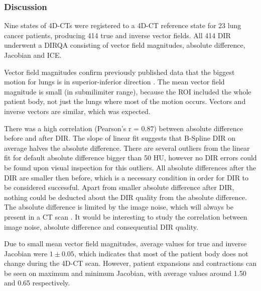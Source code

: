 \documentclass[type=dr, dr=rernat, accentcolor=tud7b,colorbacktitle, bigchapter, openright, twoside, 12pt ]{tudthesis}
\begin{document}
\newpage
\subsubsection{Discussion}
Nine states of 4D-CTs were registered to a 4D-CT reference state for 23 lung cancer patients, producing 414 true and inverse vector fields. All 414 DIR underwent a DIRQA consisting of vector field magnitudes, absolute difference, Jacobian and ICE.

Vector field magnitudes confirm previously published data that the biggest motion for lungs is in superior-inferior direction \cite{Seppenwoolde2002, Britton2007, Liu2007}. The mean vector field magnitude is small (in submilimiter range), 
because the ROI included the whole patient body, not just the lungs where most of the motion occurs. Vectors and inverse vectors are similar, which was expected.

There was a high correlation (Pearson's r = 0.87) between absolute difference before and after DIR. 
The slope of linear fit suggests that B-Spline DIR on average halves the absolute difference. There are several outliers from the
linear fit for default absolute difference bigger than 50 HU, however no DIR errors could be found upon visual inspection for this outliers.
All absolute differences after the DIR are smaller then before, which is a necessary condition in order for DIR to be considered successful. Apart from smaller absolute difference after DIR,
nothing could be deducted about the DIR quality from the absolute difference. The absolute difference is limited by the
image noise, which will always be present in a CT scan \cite{Polacin1992}. It would be interesting to study the 
correlation between image noise, absolute difference and consequential DIR quality.


Due to small mean vector field magnitudes, average values for true and inverse Jacobian were $1\pm0.05$, which indicates that most of the patient body does not change during the 4D-CT
scan. However, patient expansions and contractions can be seen on maximum and minimum Jacobian, with average values around 1.50 and 0.65 respectively. 
\end{document}
